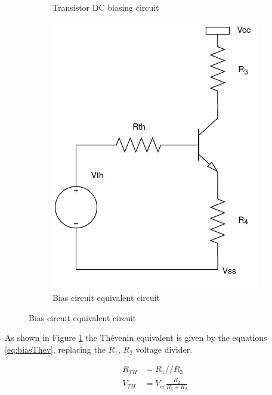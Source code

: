 \begin{figure}[H]
\begin{subfigure}{0.4\textwidth}
        \caption{Transistor DC biasing circuit}
    \end{subfigure}
    \hfill
    \begin{subfigure}{0.4\textwidth}
        \includegraphics*[scale = 0.3]{Images/VthBiasCircuit.png}
        \caption{Bias circuit equivalent circuit}
        \label{fig:DCBiasTh}
    \end{subfigure}
    \label{fig:DCBiasNPN}
\end{figure}

As shown in Figure \ref{fig:DCBiasTh} the Thévenin equivalent is given by the equations \ref{eq:biasThev}, replacing the $R_1$, $R_2$ voltage divider.

\begin{equation}
    \begin{split}
        R_{TH} &= R_1//R_2\\
        V_{TH} &= V_{cc}\frac{R_2}{R_1+R_2}
    \end{split}
    \label{eq:biasThev}
\end{equation}


